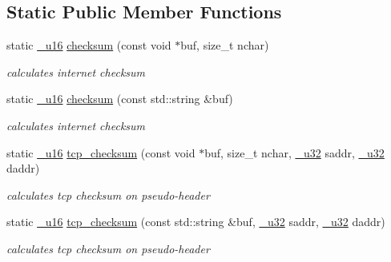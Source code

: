 \subsection*{Static Public Member Functions}
\begin{CompactItemize}
\item 
static \hyperlink{namespacesocketpp_0d48e817f00cbb84d07faec41ee4b169}{\_\-u16} \hyperlink{classsocketpp_1_1RawSocket_bb78ecebb5bd5ab5be4ee46d786fe5cd}{checksum} (const void $\ast$buf, size\_\-t nchar)
\begin{CompactList}\small\item\em calculates internet checksum \item\end{CompactList}\item 
static \hyperlink{namespacesocketpp_0d48e817f00cbb84d07faec41ee4b169}{\_\-u16} \hyperlink{classsocketpp_1_1RawSocket_67af2c9f3bc37146b54fc9fb69c0dd8d}{checksum} (const std::string \&buf)
\begin{CompactList}\small\item\em calculates internet checksum \item\end{CompactList}\item 
static \hyperlink{namespacesocketpp_0d48e817f00cbb84d07faec41ee4b169}{\_\-u16} \hyperlink{classsocketpp_1_1RawSocket_bc807e5fcf41891e21faadd7b44b851a}{tcp\_\-checksum} (const void $\ast$buf, size\_\-t nchar, \hyperlink{namespacesocketpp_d9c3b2ad093bb5814af59760e0a2192a}{\_\-u32} saddr, \hyperlink{namespacesocketpp_d9c3b2ad093bb5814af59760e0a2192a}{\_\-u32} daddr)
\begin{CompactList}\small\item\em calculates tcp checksum on pseudo-header \item\end{CompactList}\item 
static \hyperlink{namespacesocketpp_0d48e817f00cbb84d07faec41ee4b169}{\_\-u16} \hyperlink{classsocketpp_1_1RawSocket_01e34dbdba36284d5e96896dc083702b}{tcp\_\-checksum} (const std::string \&buf, \hyperlink{namespacesocketpp_d9c3b2ad093bb5814af59760e0a2192a}{\_\-u32} saddr, \hyperlink{namespacesocketpp_d9c3b2ad093bb5814af59760e0a2192a}{\_\-u32} daddr)
\begin{CompactList}\small\item\em calculates tcp checksum on pseudo-header \item\end{CompactList}\item 

\end{CompactItemize}
